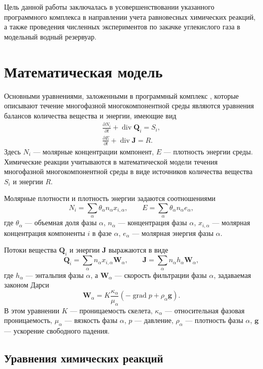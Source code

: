 \documentclass[14pt,a4paper]{extarticle}
\newcommand{\pd}[2]{\frac{\partial #1}{\partial #2}}
\renewcommand{\div}{\operatorname{div}}
\newcommand{\grad}{\operatorname{grad}}
\renewcommand{\vec}[1]{\boldsymbol{\mathbf{#1}}}
\begin{document}
Цель данной работы заключалась в усовершенствовании указанного программного комплекса в направлении учета
равновесных химических реакций, а также проведения численных экспериментов по закачке углекислого газа в модельный водный резервуар.

\clearpage
\section{Математическая модель}

Основными уравнениями, заложенными в программный комплекс \cite{shev}, которые описывают течение многофазной многокомпонентной среды являются уравнения балансов количества вещества и энергии, имеющие вид
\begin{gather*}
\pd{N_i}{t} + \div \vec Q_i = S_i,\\
\pd{E}{t} + \div \vec J = R.
\end{gather*}
Здесь $N_i$ --- молярные концентрации компонент, $E$ --- плотность энергии среды. Химические реакции учитываются в математической модели течения многофазной многокомпонентной среды в виде источников количества вещества $S_i$ и энергии $R$.

Молярные плотности и плотность энергии задаются соотношениями
\[
N_i = \sum_{\alpha} \theta_\alpha n_\alpha x_{i,\alpha},\qquad
E = \sum_{\alpha} \theta_\alpha n_\alpha e_{\alpha},
\]
где $\theta_\alpha$ --- объемная доля фазы $\alpha$, $n_\alpha$ --- концентрация фазы $\alpha$, $x_{i,\alpha}$ --- молярная концентрация компоненты $i$ в фазе $\alpha$, $e_\alpha$ --- молярная энергия фазы $\alpha$.

Потоки вещества $\vec Q_i$ и энергии $\vec J$ выражаются в виде
\[
\vec Q_i = \sum_\alpha n_\alpha x_{i,\alpha} \vec W_\alpha, \qquad
\vec J = \sum_\alpha n_\alpha h_{\alpha} \vec W_\alpha,
\]
где $h_\alpha$ --- энтальпия фазы $\alpha$, а $\vec W_\alpha$ --- скорость фильтрации фазы $\alpha$, задаваемая законом Дарси
\[
\vec W_\alpha = K \frac{\kappa_\alpha}{\mu_\alpha} (-\grad p + \rho_\alpha \vec g).
\]
В этом уравнении $K$ --- проницаемость скелета, $\kappa_\alpha$ --- относительная фазовая проницаемость, $\mu_\alpha$ --- вязкость фазы $\alpha$, $p$ --- давление, $\rho_\alpha$ --- плотность фазы $\alpha$, $\vec g$ --- ускорение свободного падения.

\subsection{Уравнения химических реакций}
\end{document}
